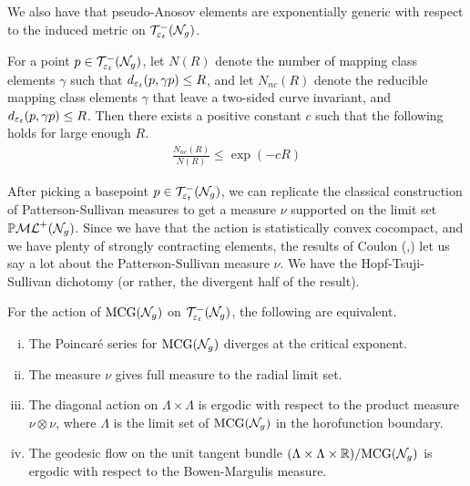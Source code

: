 We also have that pseudo-Anosov elements are exponentially generic with respect to the induced metric on $\mathcal{T}_{\varepsilon_t}^{-}(\mathcal{N}_g)$.

\begin{theorem}
  \label{thm:pure-exponential}
  For a point $p \in \mathcal{T}_{\varepsilon_t}^{-}(\mathcal{N}_g)$, let $N(R)$ denote the number of mapping class elements $\gamma$ such that $d_{\varepsilon_t}(p, \gamma p) \leq R$, and let $N_{nc}(R)$ denote the reducible mapping class elements $\gamma$ that leave a two-sided curve invariant, and $d_{\varepsilon_t}(p, \gamma p) \leq R$.
  Then there exists a positive constant $c$ such that the following holds for large enough $R$.
  \begin{align*}
    \frac{N_{nc}(R)}{N(R)} \leq \exp(-cR)
  \end{align*}
\end{theorem}

After picking a basepoint $p \in \mathcal{T}_{\varepsilon_t}^{-}(\mathcal{N}_g)$, we can replicate the classical construction of Patterson-Sullivan measures \cite{sullivan1979density} to get a measure $\nu$ supported on the limit set $\mathbb{P}\mathcal{ML}^+(\mathcal{N}_g)$.
Since we have that the action is statistically convex cocompact, and we have plenty of strongly contracting elements, the results of Coulon (\cite{coulon2022patterson},\cite{coulon2024ergodicity}) let us say a lot about the Patterson-Sullivan measure $\nu$.
We have the Hopf-Tsuji-Sullivan dichotomy (or rather, the divergent half of the result).

\begin{theorem}
  \label{thm:hts-dichotomy}
  For the action of $\mathrm{MCG}(\mathcal{N}_g)$ on $\mathcal{T}_{\varepsilon_t}^{-}(\mathcal{N}_g)$, the following are equivalent.
  \begin{enumerate}[(i)]
  \item The Poincaré series for $\mathrm{MCG}(\mathcal{N}_g)$ diverges at the critical exponent.
  \item The measure $\nu$ gives full measure to the radial limit set.
  \item The diagonal action on $\Lambda \times \Lambda$ is ergodic with respect to the product measure $\nu \otimes \nu$, where $\Lambda$ is the limit set of $\mathrm{MCG}(\mathcal{N}_g)$ in the horofunction boundary.
  \item The geodesic flow on the unit tangent bundle $(\Lambda \times \Lambda \times \mathbb{R})/\mathrm{MCG}(\mathcal{N}_g)$ is ergodic with respect to the Bowen-Margulis measure.
  \end{enumerate}
\end{theorem}

